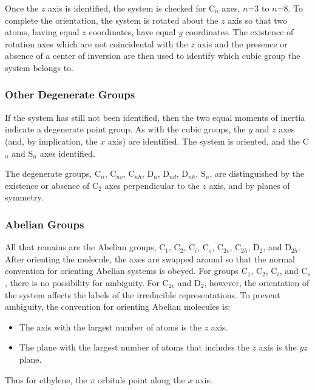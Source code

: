 Once the $z$ axis is identified, the system is checked for C$_n$ axes, $n$=3 to
$n$=8.  To complete the orientation, the system is rotated about the $z$ axis
so that two atoms, having equal $z$ coordinates, have equal $y$ coordinates.
The existence of rotation axes which are not coincidental with the $z$ axis and
the presence or absence of a center of inversion are then used to identify
which cubic group the system belongs to.

\subsubsection*{Other Degenerate Groups}
If the system has still not been identified, then the two equal moments of
inertia indicate a degenerate point group.  As with the cubic groups, the $y$ and
$z$ axes (and, by implication, the $x$ axis) are identified. The system is
oriented, and the C$_n$ and S$_n$ axes identified.

The degenerate groups, C$_n$, C$_{nv}$, C$_{nh}$, D$_n$, D$_{nd}$, D$_{nh}$, 
S$_n$, are distinguished by the existence or absence of C$_2$ axes
perpendicular to the $z$ axis, and by planes of symmetry.


\subsubsection*{Abelian Groups}
All that remains are the Abelian groups, C$_1$, C$_2$, C$_i$, C$_s$,  C$_{2v}$,
C$_{2h}$, D$_2$,  and D$_{2h}$.  After orienting the molecule, the axes are
swapped around so that the normal convention for orienting Abelian systems is
obeyed.  For groups C$_1$, C$_2$, C$_i$, and C$_s$, there is no possibility for
ambiguity.  For C$_{2v}$ and D$_2$, however, the orientation of the system
affects the labels of the irreducible representations.  To prevent ambiguity,
the convention for orienting Abelian molecules is:
\begin{itemize}
\item The axis with the largest number of atoms is the $z$  axis.
\item The plane with the largest number of atoms that includes the $z$ axis is 
the $yz$  plane.
\end{itemize}
Thus for ethylene, the $\pi$ orbitals point along the $x$  axis.

